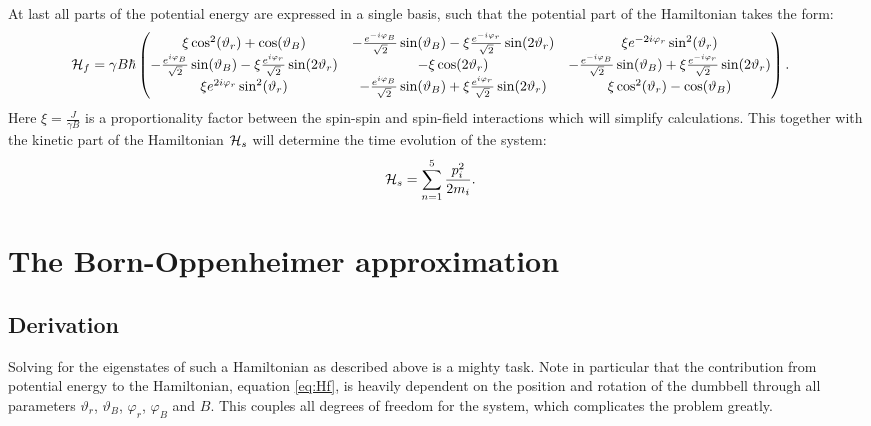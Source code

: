 \documentclass[a4paper]{article}
\begin{document}
At last all parts of the potential energy are expressed in a single basis, such that the
potential part of the Hamiltonian takes the form:
\begin{align}\label{eq:Hf}
        \mathbb{\cal H}_f &= \gamma B \hbar{} \pmqty{
                 \xi\cos[2](\vartheta_r) + \cos(\vartheta_B)& -\frac{
                        e^{-i\varphi_B}}{\sqrt{2}
                }\sin(\vartheta_B) - \xi\frac{e^{-i\varphi_r}}{\sqrt{2} }\sin(2\vartheta_r) &
                \xi e^{-2i\varphi_r}\sin[2](\vartheta_r)\\
                 -\frac{e^{i\varphi_B}}{\sqrt{2}}\sin(\vartheta_B) -
                \xi \frac{e^{i\varphi_r}}{\sqrt{2} }\sin(2\vartheta_r) &
                -\xi\cos(2\vartheta_r) & -\frac{
                e^{-i\varphi_B}}{\sqrt{2} }\sin(\vartheta_B)+ \xi\frac{e^{-i\varphi_r}}{\sqrt{2}
        }\sin(2\vartheta_r)\\
                \xi e^{2i\varphi_r}\sin[2](\vartheta_r) & -\frac{
                e^{i\varphi_B}}{\sqrt{2} }\sin(\vartheta_B) +
                        \xi \frac{e^{i\varphi_r}}{\sqrt{2} }\sin(2\vartheta_r) &
                        \xi \cos[2](\vartheta_r) - \cos(\vartheta_B) 
        }
.\end{align}
Here \(\xi = \frac{J}{\gamma B}\) is a proportionality factor between the spin-spin
and spin-field interactions which will simplify calculations. This together with the
kinetic part of the Hamiltonian \(\mathbb{\cal H}_s\) will determine the time evolution of
the system:
\begin{align}\label{eq:Hs}
        \mathbb{\cal H}_s &= \sum_{n=1}^{5} \frac{p_i^2}{2m_i}
.\end{align}
\section{The Born-Oppenheimer approximation}
\subsection{Derivation}
Solving for the eigenstates of such a Hamiltonian as described above is a mighty task. Note
in particular that the contribution from potential energy to the Hamiltonian, equation
\ref{eq:Hf}, is heavily dependent on the position and rotation of the dumbbell through all
parameters \(\vartheta_r \), \(\vartheta_B\), \(\varphi_r\),
\(\varphi_B\) and \(B\). This couples all degrees of freedom for the system, which complicates
the problem greatly.
\end{document}
